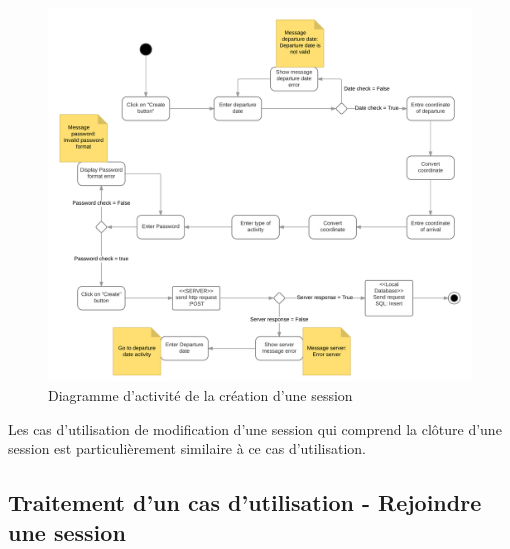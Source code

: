 \documentclass[titlepage, 12pt]{report}
\begin{document}

\begin{figure}[!h]
	\caption{Diagramme d'activité de la création d'une session}
	\label{create_session_activity_diagram}
	\centering
	\includegraphics[scale=0.7]{Images/diagram/create_session_activity_diagram.png}
\end{figure}

Les cas d'utilisation de modification d'une session qui comprend la clôture d'une session est particulièrement similaire à ce cas d'utilisation.



\subsection{Traitement d'un cas d'utilisation - Rejoindre une session}

\end{document}
